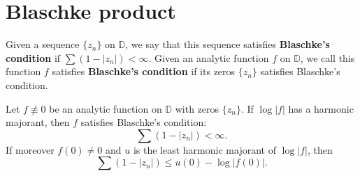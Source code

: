 \section{Blaschke product}
\begin{definition}
Given a sequence $\{z_n\}$ on $\mathbb{D}$, we say that this sequence satisfies
\textbf{Blaschke's condition} if $\sum (1-|z_n|)<\infty$. Given an analytic function $f$ on 
$\mathbb{D}$, we call this function $f$ satisfies \textbf{Blaschke's condition} if its
zeros $\{z_n\}$ satisfies Blaschke's condition.
\end{definition}

\begin{theorem}\label{Blaschke condition from harmonic majorant}
Let $f\not\equiv 0$ be an analytic function on $\mathbb{D}$ with zeros $\{z_n\}$. If
$\log|f|$ has a harmonic majorant, then $f$ satisfies Blaschke's condition:
\begin{equation*}
  \sum(1-|z_n|)<\infty.
\end{equation*}
If moreover $f(0)\neq 0$ and $u$ is the least harmonic majorant of $\log|f|$, then
\begin{equation*}
  \sum(1-|z_n|)\leq u(0)-\log|f(0)|.
\end{equation*}
\end{theorem}

